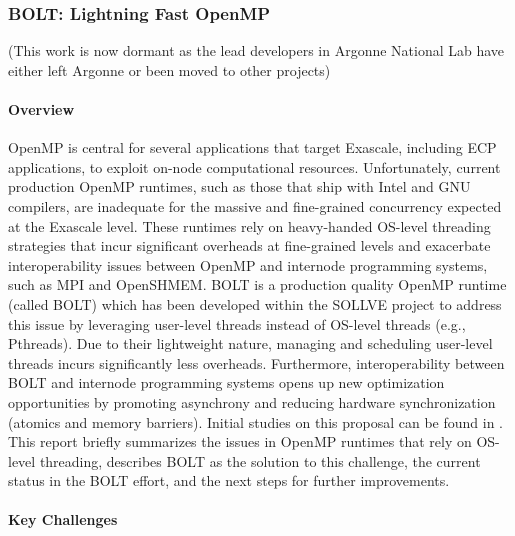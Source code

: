 \subsubsection{ BOLT: Lightning Fast OpenMP}\label{subsubsect:bolt}


(This work is now dormant as the lead developers in Argonne National Lab have either left Argonne or been moved to other projects)

\paragraph{Overview}

OpenMP is central for several applications that target Exascale,
including ECP applications, to exploit on-node computational
resources.  Unfortunately, current production OpenMP runtimes, such as
those that ship with Intel and GNU compilers, are inadequate for the
massive and fine-grained concurrency expected at the Exascale level.
These runtimes rely on heavy-handed OS-level threading strategies that
incur significant overheads at fine-grained levels and exacerbate
interoperability issues between OpenMP and internode programming
systems, such as MPI and OpenSHMEM.  BOLT is a production quality
OpenMP runtime (called BOLT) which has been developed within the
SOLLVE project to address this issue by leveraging user-level threads
instead of OS-level threads (e.g., Pthreads).  Due to their
lightweight nature, managing and scheduling user-level threads incurs
significantly less overheads.  Furthermore, interoperability between
BOLT and internode programming systems opens up new optimization
opportunities by promoting asynchrony and reducing hardware
synchronization (atomics and memory barriers).  Initial studies on
this proposal can be found in \cite{amer2018, ccgrid, ppopp}. This
report briefly summarizes the issues in OpenMP runtimes that rely on
OS-level threading, describes BOLT as the solution to this challenge,
the current status in the BOLT effort, and the next steps for further
improvements.

\paragraph{Key Challenges}

